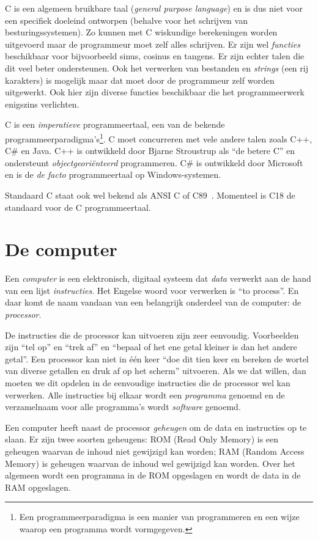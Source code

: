 C is een algemeen bruikbare taal (\textsl{general purpose language}) en is dus niet voor een specifiek doeleind ontworpen (behalve voor het schrijven van besturingssystemen). Zo kunnen met C wiskundige berekeningen worden uitgevoerd maar de programmeur moet zelf alles schrijven. Er zijn wel \textsl{functies} beschikbaar voor bijvoorbeeld sinus, cosinus en tangens. Er zijn echter talen die dit veel beter ondersteunen. Ook het verwerken van bestanden en \textsl{strings} (een rij karakters) is mogelijk maar dat moet door de programmeur zelf worden uitgewerkt. Ook hier zijn diverse functies beschikbaar die het programmeerwerk enigszins verlichten.

C is een \textsl{imperatieve} programmeertaal, een van de bekende programmeerparadigma's\footnote{Een programmeerparadigma is een manier van programmeren en een wijze waarop een programma wordt vormgegeven.}.
C moet concurreren met vele andere talen zoals C++, C\# en Java. C++ is ontwikkeld door Bjarne Stroustrup als ``de betere C'' en ondersteunt \textsl{objectgeoriënteerd} programmeren. C\# is ontwikkeld door Microsoft en is de \textsl{de facto} programmeertaal op Windows-systemen.

Standaard C staat ook wel bekend als ANSI C of C89~\cite{1989programming}. Momenteel is C18 de standaard voor de C programmeertaal.

\section{De computer}
Een \textsl{computer} is een elektronisch, digitaal systeem dat \textsl{data} verwerkt aan de hand van een lijst \textsl{instructies}. Het Engelse woord voor verwerken is ``to process''. En daar komt de naam vandaan van een belangrijk onderdeel van de computer: de \textsl{processor}. 

De instructies die de processor kan uitvoeren zijn zeer eenvoudig. Voorbeelden zijn ``tel op'' en ``trek af'' en ``bepaal of het ene getal kleiner is dan het andere getal''. Een processor kan niet in één keer ``doe dit tien keer en bereken de wortel van diverse getallen en druk af op het scherm'' uitvoeren. Als we dat willen, dan moeten we dit opdelen in de eenvoudige instructies die de processor wel kan verwerken. Alle instructies bij elkaar wordt een \textsl{programma} genoemd en de verzamelnaam voor alle programma's wordt \textsl{software} genoemd.

Een computer heeft naast de processor \textsl{geheugen} om de data en instructies op te slaan. Er zijn twee soorten geheugens: ROM (Read Only Memory) is een geheugen waarvan de inhoud niet gewijzigd kan worden; RAM (Random Access Memory) is geheugen waarvan de inhoud wel gewijzigd kan worden. Over het algemeen wordt een programma in de ROM opgeslagen en wordt de data in de RAM opgeslagen.

